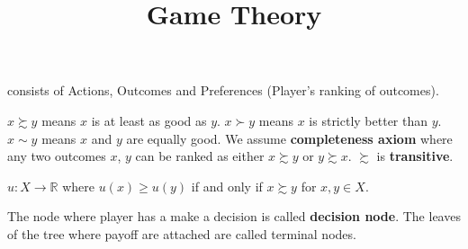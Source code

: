 \documentclass[12pt]{article}
\newcommand{\R}{\mathbb{R}}
\newenvironment{defn}[2][]{\begin{trivlist}
\item[\hskip \labelsep {\bfseries #1}\hskip \labelsep {\bfseries #2.}]}{\end{trivlist}}
\newenvironment{exercise}[2][Exercise]{\begin{trivlist}
\item[\hskip \labelsep {\bfseries #1}\hskip \labelsep {\bfseries #2.}]}{\end{trivlist}}
\begin{document}
 
 
 
\title{Game Theory}
\maketitle
 
\begin{defn}{Decision Problem} consists of Actions, Outcomes and Preferences (Player's ranking of outcomes).
\end{defn}

\begin{defn}{Preference relations} $x \succsim y$ means $x$ is at least as good as $y$. $x \succ y$ means $x$ is strictly better than $y$. $x \sim y$ means $x$ and $y$ are equally good. We assume \textbf{completeness axiom} where any two outcomes $x$, $y$ can be ranked as either $x \succsim y$ or $y \succsim x$. $\succsim$ is \textbf{transitive}.
\end{defn}

\begin{defn}{Payoff function} $u: X \longrightarrow \R$ where $u(x) \geq u(y)$ if and only if $x \succsim y$ for $x, y \in X$.
\end{defn}
 
\begin{defn}{Decision Tree} The node where player has a make a decision is called \textbf{decision node}. The leaves of the tree where payoff are attached are called terminal nodes.
\end{defn}

\begin{exercise}{1.3}
    
\end{exercise}
\end{document}
